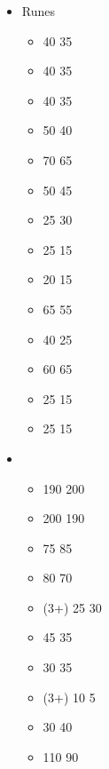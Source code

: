 \begin{multicols}{2}

\begin{itemize}
	  \item Runes
	\begin{itemize}
  \item \runeofpenetration{} 40 \costdown{} 35
  \item \runeofmight{} 40 \costdown{} 35
  \item \runeofprecision{} 40 \costdown{} 35
  \item \runeofresistance{} 50 \costdown{} 40
  \item \runeofdevouring{} 70 \costdown{} 65
  \item \runeofcourage{} 50 \costdown{} 45
  \item \runeofreadiness{} 25 \costup{} 30
  \item \runeofstorms{} 25 \costdown{} 15
  \item \runeofkinship{} 20 \costdown{} 15
  \item \runicstandardofshielding{} 65 \costdown{} 55
  \item \runicstandardofdismay{} 40 \costdown{} 25
  \item \runicstandardofswiftness{} 60 \costup{} 65
  \item \runicstandardofanvil{} 25 \costdown{} 15
  \item \runicstandardofsteadiness{} 25 \costdown{} 15
	\end{itemize}
	  \item \characters
	\begin{itemize}
  \item \anvilofpower{} \basecost{} 190 \costup{} 200
  \item \dragonseeker{} \basecost{} 200 \costdown{} 190
  \item \dragonseeker{} \monsterseeker{} 75 \costup{} 85
  \item \dragonseeker{} \grimresolve{} 80 \costdown{} 70
  \item \engineer{} \wyrmslayerrocket{} (3+) 25 \costup{} 30
  \item \engineer{} \ancestralmemory{} 45 \costdown{} 35
  \item \engineer{} \battlerune{} 30 \costup{} 35
  \item \king{} \guildcraftedhandgun{} (3+) 10 \costdown{} 5
  \item \king{} \battlerune{} 30 \costup{} 40
  \item \king{} \shieldbearers{} 110 \costdown{} 90

\end{itemize}
\end{itemize}
\end{multicols}
